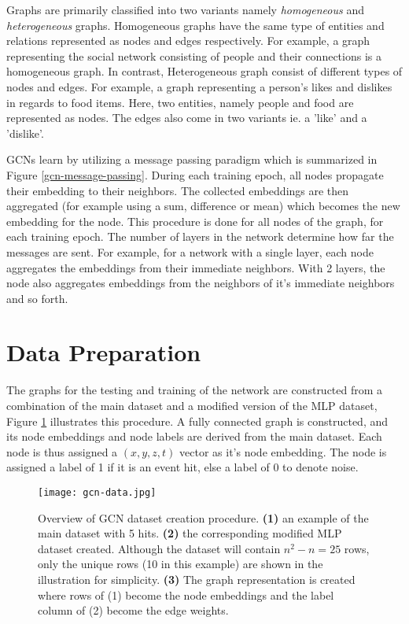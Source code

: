 Graphs are primarily classified into two variants namely
\emph{homogeneous} and \emph{heterogeneous} graphs. Homogeneous graphs
have the same type of entities and relations represented as nodes and
edges respectively. For example, a graph representing the social
network consisting of people and their connections is a homogeneous
graph. In contrast, Heterogeneous graph consist of different types of
nodes and edges. For example, a graph representing a person's likes
and dislikes in regards to food items. Here, two entities, namely
people and food are represented as nodes. The edges also come in two
variants ie. a 'like' and a 'dislike'.

GCNs learn by utilizing a message passing paradigm which is summarized
in Figure \ref{gcn-message-passing}. During each training epoch, all
nodes propagate their embedding to their neighbors. The collected
embeddings are then aggregated (for example using a sum, difference or
mean) which becomes the new embedding for the node. This procedure is
done for all nodes of the graph, for each training epoch. The number
of layers in the network determine how far the messages are sent. For
example, for a network with a single layer, each node aggregates the
embeddings from their immediate neighbors. With 2 layers, the node
also aggregates embeddings from the neighbors of it's immediate
neighbors and so forth.

\section{Data Preparation}
\label{sec:gcn-data-prep}

The graphs for the testing and training of the network are constructed
from a combination of the main dataset and a modified version of the
MLP dataset, Figure \ref{fig:gcn-data} illustrates this procedure. A
fully connected graph is constructed, and its node embeddings and node
labels are derived from the main dataset. Each node is thus assigned a
$(x,y,z,t)$ vector as it's node embedding. The node is assigned a
label of 1 if it is an event hit, else a label of 0 to denote noise.

\begin{figure}[htb]
  \centering
  \texttt{[image: gcn-data.jpg]}
  \caption{Overview of GCN dataset creation procedure. \textbf{(1)} an
    example of the main dataset with 5 hits. \textbf{(2)} the
    corresponding modified MLP dataset created. Although the dataset
    will contain $n^{2}-n = 25$ rows, only the unique rows (10 in this
    example) are shown in the illustration for simplicity.
    \textbf{(3)} The graph representation is created where rows of (1)
    become the node embeddings and the label column of (2) become the
    edge weights.}
  \label{fig:gcn-data}
\end{figure}

